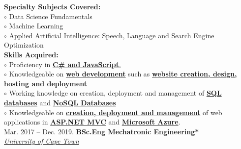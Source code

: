 \documentclass[10pt,a4paper,ragged2e,withhyper]{altacv}
\newcommand{\myhref}[2]{
		\href{#1}
		{\textcolor{ColorTwo}{#2}}
	}
\begin{document}
\begin{adjustbox}{valign=t}
\begin{minipage}{0.6\textwidth}
\begin{small}
									
                        \end{small}
            \textbf{Specialty Subjects Covered:}\\
									\textcolor{ColorOne}{$\circ$} Data Science Fundamentals\\
									\textcolor{ColorOne}{$\circ$} Machine Learning\\
									\textcolor{ColorOne}{$\circ$} Applied Artificial Intelligence: Speech, Language and Search Engine
									\newline Optimization\\
									\textbf{Skills Acquired:}\\
									\textcolor{ColorOne}{$\circ$} Proficiency in \underline{\textbf{C\# and JavaScript}.}\\
            \textcolor{ColorOne}{$\circ$} Knowledgeable on \underline{\textbf{web development}} such as \underline{\textbf{website creation, design, hosting and deployment}}\\
									\textcolor{ColorOne}{$\circ$} Working knowledge on creation, deployment and management of \underline{\textbf{SQL databases}} and \underline{\textbf{NoSQL Databases}}\\
									\textcolor{ColorOne}{$\circ$} Knowledgeable on \underline{\textbf{creation, deployment and management}} of web
									applications in \underline{\textbf{ASP.NET MVC}} and \underline{\textbf{Microsoft Azure}}.\\
            \textcolor{ColorOne}{Mar. 2017 -- Dec. 2019.}  \newline
            			{\textbf{BSc.Eng Mechatronic Engineering*}}\\ \medskip 
                    	\textit{\myhref{https://www.uct.ac.za/}{University of Cape Town}     }
          \begin{description}
              

\end{description}
\end{minipage}
\end{adjustbox}
\end{document}
